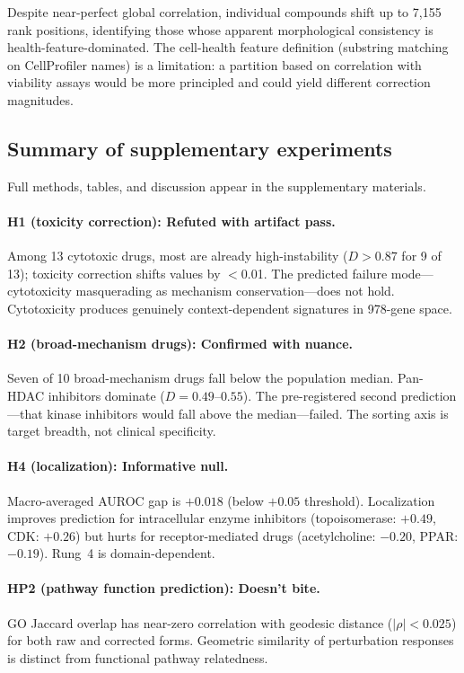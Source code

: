 \documentclass{article}
\begin{document}
Despite near-perfect global correlation, individual compounds shift up
to 7{,}155 rank positions, identifying those whose apparent morphological
consistency is health-feature-dominated. The cell-health feature
definition (substring matching on CellProfiler names) is a limitation:
a partition based on correlation with viability assays would be more
principled and could yield different correction magnitudes.

\subsection{Summary of supplementary experiments}

Full methods, tables, and discussion appear in the supplementary materials.

\paragraph{H1 (toxicity correction): Refuted with artifact pass.}
Among 13 cytotoxic drugs, most are already high-instability ($D > 0.87$
for 9 of 13); toxicity correction shifts values by $<$0.01. The predicted
failure mode---cytotoxicity masquerading as mechanism conservation---does
not hold. Cytotoxicity produces genuinely context-dependent signatures in
978-gene space.

\paragraph{H2 (broad-mechanism drugs): Confirmed with nuance.}
Seven of 10 broad-mechanism drugs fall below the population median.
Pan-HDAC inhibitors dominate ($D = 0.49$--$0.55$). The pre-registered
second prediction---that kinase inhibitors would fall above the
median---failed. The sorting axis is target breadth, not clinical
specificity.

\paragraph{H4 (localization): Informative null.}
Macro-averaged AUROC gap is $+0.018$ (below $+0.05$ threshold). Localization
improves prediction for intracellular enzyme inhibitors (topoisomerase:
$+0.49$, CDK: $+0.26$) but hurts for receptor-mediated drugs
(acetylcholine: $-0.20$, PPAR: $-0.19$). Rung~4 is domain-dependent.

\paragraph{HP2 (pathway function prediction): Doesn't bite.}
GO Jaccard overlap has near-zero correlation with geodesic distance
($|\rho| < 0.025$) for both raw and corrected forms. Geometric similarity
of perturbation responses is distinct from functional pathway relatedness.
\end{document}
